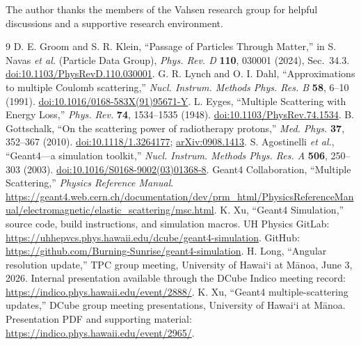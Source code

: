 \documentclass[10pt,letterpaper]{article}
\begin{document}
The author thanks the members of the Vahsen research group for helpful discussions and a supportive research environment. 

\begin{thebibliography}{9}
 D. E. Groom and S. R. Klein, ``Passage of Particles Through Matter,'' in S. Navas \emph{et al.} (Particle Data Group), \emph{Phys. Rev. D} \textbf{110}, 030001 (2024), Sec.~34.3. \href{https://doi.org/10.1103/PhysRevD.110.030001}{doi:10.1103/PhysRevD.110.030001}.
 G. R. Lynch and O. I. Dahl, ``Approximations to multiple Coulomb scattering,'' \emph{Nucl. Instrum. Methods Phys. Res. B} \textbf{58}, 6--10 (1991). \href{https://doi.org/10.1016/0168-583X(91)95671-Y}{doi:10.1016/0168-583X(91)95671-Y}.
 L. Eyges, ``Multiple Scattering with Energy Loss,'' \emph{Phys. Rev.} \textbf{74}, 1534--1535 (1948). \href{https://doi.org/10.1103/PhysRev.74.1534}{doi:10.1103/PhysRev.74.1534}.
 B. Gottschalk, ``On the scattering power of radiotherapy protons,'' \emph{Med. Phys.} \textbf{37}, 352--367 (2010). \href{https://doi.org/10.1118/1.3264177}{doi:10.1118/1.3264177}; \href{https://arxiv.org/abs/0908.1413}{arXiv:0908.1413}.
 S. Agostinelli \emph{et al.}, ``Geant4---a simulation toolkit,'' \emph{Nucl. Instrum. Methods Phys. Res. A} \textbf{506}, 250--303 (2003). \href{https://doi.org/10.1016/S0168-9002(03)01368-8}{doi:10.1016/S0168-9002(03)01368-8}.
 Geant4 Collaboration, ``Multiple Scattering,'' \emph{Physics Reference Manual}. \url{https://geant4.web.cern.ch/documentation/dev/prm_html/PhysicsReferenceManual/electromagnetic/elastic_scattering/msc.html}.
 K. Xu, ``Geant4 Simulation,'' source code, build
instructions, and simulation macros. UH Physics GitLab:\newline
\url{https://uhhepvcs.phys.hawaii.edu/dcube/geant4-simulation}.\newline
GitHub:\newline
\url{https://github.com/Burning-Sunrise/geant4-simulation}.
 H. Long, ``Angular resolution update,'' TPC group meeting,
University of Hawai`i at M\=anoa, June 3, 2026. Internal presentation available
through the DCube Indico meeting record:
\url{https://indico.phys.hawaii.edu/event/2888/}.
 K. Xu, ``Geant4 multiple-scattering updates,'' DCube group
meeting presentations, University of Hawai`i at M\=anoa. Presentation PDF and
supporting material:
\url{https://indico.phys.hawaii.edu/event/2965/}.
\end{thebibliography}
\end{document}

